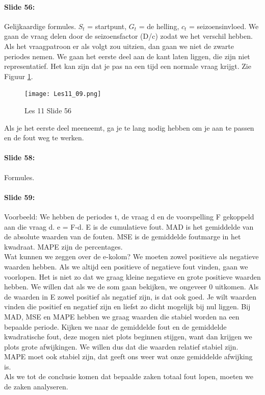\documentclass[10pt,a4paper]{report}
\begin{document}
\paragraph{Slide 56:} Gelijkaardige formules. $S_{t}$ = startpunt, $G_{t}$ = de helling, $c_{t}$ = seizoensinvloed. We gaan de vraag delen door de seizoensfactor (D/c) zodat we het verschil hebben.\\
Als het vraagpatroon er als volgt zou uitzien, dan gaan we niet de zwarte periodes nemen. We gaan het eerste deel aan de kant laten liggen, die zijn niet representatief. Het kan zijn dat je pas na een tijd een normale vraag krijgt. Zie Figuur \ref{les11_09}. \\

\begin{figure}[h!]
\centering
\texttt{[image: Les11\_09.png]}
\caption{Les 11 Slide 56} 
\label{les11_09}
\end{figure}

Als je het eerste deel meeneemt, ga je te lang nodig hebben om je aan te passen en de fout weg te werken.

\paragraph{Slide 58:} Formules.

\paragraph{Slide 59:} Voorbeeld: We hebben de periodes t, de vraag d en de voorspelling F gekoppeld aan die vraag d. e = F-d. E is de cumulatieve fout. MAD is het gemiddelde van de absolute waarden van de fouten. MSE is de gemiddelde foutmarge in het kwadraat. MAPE zijn de percentages.\\
Wat kunnen we zeggen over de e-kolom? We moeten zowel positieve als negatieve waarden hebben. Als we altijd een positieve of negatieve fout vinden, gaan we voorlopen. Het is niet zo dat we graag kleine negatieve en grote positieve waarden hebben. We willen dat als we de som gaan bekijken, we ongeveer 0 uitkomen. Als de waarden in E zowel positief als negatief zijn, is dat ook goed. Je wilt waarden vinden die positief en negatief zijn en liefst zo dicht mogelijk bij nul liggen. Bij MAD, MSE en MAPE hebben we graag waarden die stabiel worden na een bepaalde periode. Kijken we naar de gemiddelde fout en de gemiddelde kwadratische fout, deze mogen niet plots beginnen stijgen, want dan krijgen we plots grote afwijkingen. We willen dus dat die waarden relatief stabiel zijn. MAPE moet ook stabiel zijn, dat geeft ons weer wat onze gemiddelde afwijking is.\\
Als we tot de conclusie komen dat bepaalde zaken totaal fout lopen, moeten we de zaken analyseren.
\end{document}
